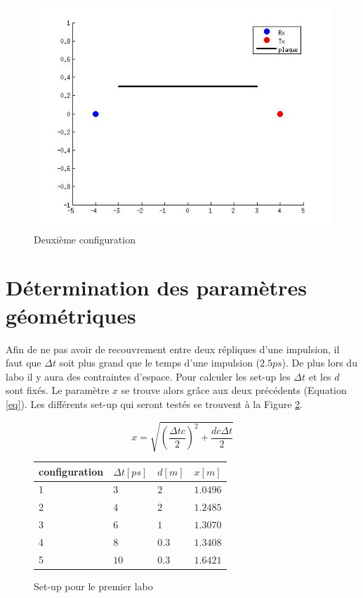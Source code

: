 \documentclass[10pt,a4paper]{article}
\begin{document}
	\begin{figure}[h]
	\centering
	\includegraphics[scale=0.4]{conf2.jpg}
	\caption{Deuxième configuration \label{conf2}}
	\end{figure}		
	
	
	\section{Détermination des paramètres géométriques}
		Afin de ne pas avoir de recouvrement entre deux répliques d'une impulsion, il faut que $\Delta t$ soit plus grand que le temps d'une impulsion ($2.5ps$). De plus lors du labo il y aura des contraintes d'espace. Pour calculer les set-up les $\Delta t$ et les $d$ sont fixés. Le paramètre $x$ se trouve alors grâce aux deux précédents (Equation \ref{eq}). Les différents set-up qui seront testés se trouvent à la Figure \ref{set}.
		
		\begin{equation}
			x = \sqrt{(\frac{\Delta t c}{2})^2 + \frac{d c \Delta t}{2}}
			\label{eq}
		\end{equation}
		
		
		\begin{figure}[h]
		\centering
		\begin{tabular}{|l|l|l|l|}
		\hline
		 configuration & $\Delta t [ps]$ & $d [m]$ & $x [m]$ \\
		 \hline
		 1 & $3$ & $2$ & $1.0496$ \\
		 2 & $4$ & $2$ & $1.2485$ \\
		 3 & $6$ & $1$ & $1.3070$ \\
		 4 & $8$ & $0.3$ & $1.3408$ \\
		 5 & $10$ & $0.3$ & $1.6421$ \\
		 \hline
		\end{tabular}
		
		\caption{Set-up pour le premier labo}
		\label{set}
		\end{figure}
\end{document}
